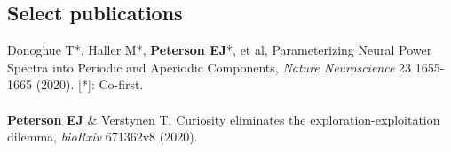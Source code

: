 \documentclass[margin,line]{res}
\begin{document}
\begin{resume}
\vspace{-.4cm} 
\section{\sc Select publications}
Donoghue T*, Haller M*, \textbf{Peterson EJ}*, et al, Parameterizing Neural Power Spectra into Periodic and Aperiodic Components, \emph{Nature Neuroscience} 23 1655-1665 (2020). [*]: Co-first. 
\\ 
\vspace{-.35cm} 
\\
\textbf{Peterson EJ} \& Verstynen T, Curiosity eliminates the exploration-exploitation dilemma, \emph{bioRxiv} 671362v8 (2020). 

\end{resume}
\end{document}
